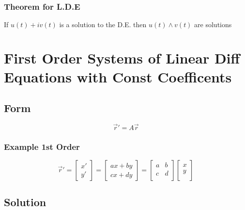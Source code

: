 \documentclass[11pt]{article}
\begin{document}
\subsubsection{Theorem for L.D.E}
\label{sec-9.3.3}

    If $u(t)+iv(t)$ is a solution to the D.E. then $u(t) \wedge v(t)$
    are solutions

\section{First Order Systems of Linear Diff Equations with Const Coefficents}
\label{sec-10}

\subsection{Form}
\label{sec-10.1}

   \begin{equation}
   \vec{r}' = A\vec{r}
   \end{equation}
\subsubsection{Example 1st Order}
\label{sec-10.1.1}

    \begin{equation}
    \vec{r}' = \left [
    \begin{array}{c}
    x' \\
    y'
    \end{array} \right ] = \left [
    \begin{array}{c}
    ax+by\\
    cx+dy
    \end{array} \right ] = \left [
    \begin{array}{cc}
    a & b\\
    c & d\\
    \end{array} \right ] \left [
    \begin{array}{c}
    x\\
    y\\
    \end{array} \right ]
    \end{equation}
\subsection{Solution}
\label{sec-10.2}
\end{document}
